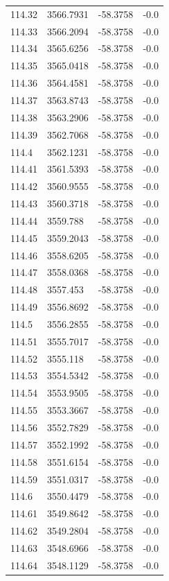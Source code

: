 \begin{table}[H]
\begin{tabular}{llll}
114.32 & 3566.7931 & -58.3758 & -0.0 \\
114.33 & 3566.2094 & -58.3758 & -0.0 \\
114.34 & 3565.6256 & -58.3758 & -0.0 \\
114.35 & 3565.0418 & -58.3758 & -0.0 \\
114.36 & 3564.4581 & -58.3758 & -0.0 \\
114.37 & 3563.8743 & -58.3758 & -0.0 \\
114.38 & 3563.2906 & -58.3758 & -0.0 \\
114.39 & 3562.7068 & -58.3758 & -0.0 \\
114.4 & 3562.1231 & -58.3758 & -0.0 \\
114.41 & 3561.5393 & -58.3758 & -0.0 \\
114.42 & 3560.9555 & -58.3758 & -0.0 \\
114.43 & 3560.3718 & -58.3758 & -0.0 \\
114.44 & 3559.788 & -58.3758 & -0.0 \\
114.45 & 3559.2043 & -58.3758 & -0.0 \\
114.46 & 3558.6205 & -58.3758 & -0.0 \\
114.47 & 3558.0368 & -58.3758 & -0.0 \\
114.48 & 3557.453 & -58.3758 & -0.0 \\
114.49 & 3556.8692 & -58.3758 & -0.0 \\
114.5 & 3556.2855 & -58.3758 & -0.0 \\
114.51 & 3555.7017 & -58.3758 & -0.0 \\
114.52 & 3555.118 & -58.3758 & -0.0 \\
114.53 & 3554.5342 & -58.3758 & -0.0 \\
114.54 & 3553.9505 & -58.3758 & -0.0 \\
114.55 & 3553.3667 & -58.3758 & -0.0 \\
114.56 & 3552.7829 & -58.3758 & -0.0 \\
114.57 & 3552.1992 & -58.3758 & -0.0 \\
114.58 & 3551.6154 & -58.3758 & -0.0 \\
114.59 & 3551.0317 & -58.3758 & -0.0 \\
114.6 & 3550.4479 & -58.3758 & -0.0 \\
114.61 & 3549.8642 & -58.3758 & -0.0 \\
114.62 & 3549.2804 & -58.3758 & -0.0 \\
114.63 & 3548.6966 & -58.3758 & -0.0 \\
114.64 & 3548.1129 & -58.3758 & -0.0 \\

\end{tabular}
\end{table}
